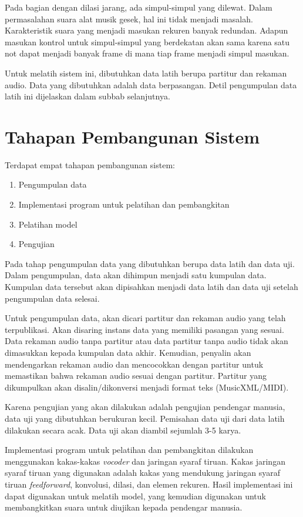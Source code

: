 Pada bagian dengan dilasi jarang, ada simpul-simpul yang dilewat. Dalam permasalahan suara alat musik gesek, hal ini tidak menjadi masalah. Karakteristik suara yang menjadi masukan rekuren banyak redundan. Adapun masukan kontrol untuk simpul-simpul yang berdekatan akan sama karena satu not dapat menjadi banyak frame di mana tiap frame menjadi simpul masukan.

Untuk melatih sistem ini, dibutuhkan data latih berupa partitur dan rekaman audio. Data yang dibutuhkan adalah data berpasangan. Detil pengumpulan data latih ini dijelaskan dalam subbab selanjutnya.

\section{Tahapan Pembangunan Sistem}

Terdapat empat tahapan pembangunan sistem:

\begin{enumerate}
    \item Pengumpulan data
    \item Implementasi program untuk pelatihan dan pembangkitan
    \item Pelatihan model
    \item Pengujian
\end{enumerate}

Pada tahap pengumpulan data yang dibutuhkan berupa data latih dan data uji. Dalam pengumpulan, data akan dihimpun menjadi satu kumpulan data. Kumpulan data tersebut akan dipisahkan menjadi data latih dan data uji setelah pengumpulan data selesai.

Untuk pengumpulan data, akan dicari partitur dan rekaman audio yang telah terpublikasi. Akan disaring instans data yang memiliki pasangan yang sesuai. Data rekaman audio tanpa partitur atau data partitur tanpa audio tidak akan dimasukkan kepada kumpulan data akhir. Kemudian, penyalin akan mendengarkan rekaman audio dan mencocokkan dengan partitur untuk memastikan bahwa rekaman audio sesuai dengan partitur. Partitur yang dikumpulkan akan disalin/dikonversi menjadi format teks (MusicXML/MIDI).

Karena pengujian yang akan dilakukan adalah pengujian pendengar manusia, data uji yang dibutuhkan berukuran kecil. Pemisahan data uji dari data latih dilakukan secara acak. Data uji akan diambil sejumlah 3-5 karya.

Implementasi program untuk pelatihan dan pembangkitan dilakukan menggunakan kakas-kakas \textit{vocoder} dan jaringan syaraf tiruan. Kakas jaringan syaraf tiruan yang digunakan adalah kakas yang mendukung jaringan syaraf tiruan \textit{feedforward}, konvolusi, dilasi, dan elemen rekuren. Hasil implementasi ini dapat digunakan untuk melatih model, yang kemudian digunakan untuk membangkitkan suara untuk diujikan kepada pendengar manusia.